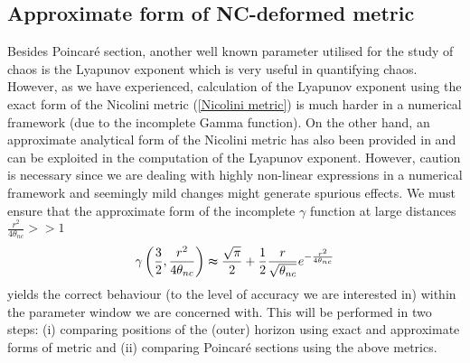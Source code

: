 \documentclass[aps,prd,showpacs,nofootinbib,floats,floatfix,preprintnumbers,groupedaddress,twocolumn]{revtex4-1}
\begin{document}
\subsection{Approximate form of NC-deformed metric}
%
%
%
%
%
\par\noindent
Besides Poincar\'e section, another well known parameter utilised for the study of chaos is the Lyapunov exponent which is very useful in quantifying chaos. However, as we have experienced, calculation of the Lyapunov exponent using  the exact form of the Nicolini metric (\ref{Nicolini metric}) is  much harder in a numerical framework (due to the incomplete Gamma function).  On the other hand, an approximate analytical form of the Nicolini metric has also been provided in \cite{Nicolini:2008aj} and can be exploited in the computation of the Lyapunov exponent. However, caution is necessary since we are dealing with highly non-linear expressions in a numerical framework and seemingly mild changes might generate spurious effects. We must ensure that the approximate form of the incomplete $\gamma$ function  at large distances $\frac{r^{2}}{4\theta_{nc}}>>1$ \cite{Nicolini:2008aj} 
%
%
%
%
\begin{eqnarray}\label{app}
\gamma\left(\frac{3}{2},\frac{r^{2}}{4\theta_{nc}}\right)\thickapprox \frac{\sqrt{\pi}}{2}+\frac{1}{2}\frac{r}{\sqrt{\theta_{nc}}}e^{-\frac{r^{2}}{4\theta_{nc}}}
\end{eqnarray}
%
%
%
yields the correct behaviour (to the level of accuracy we are interested in) within the parameter window we are concerned with. This will be performed in two steps: (i) comparing  positions of the (outer) horizon using exact and approximate forms of metric and (ii) comparing Poincar\'e sections using the above metrics.  
\end{document}
